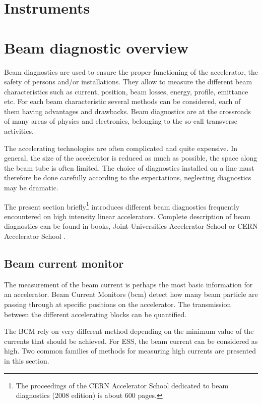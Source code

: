 \begin{refsection}
  \section{Instruments}

  

  \section{Beam diagnostic overview}
  Beam diagnostics are used to ensure the proper functioning of the accelerator, the safety of persons and/or installations. They allow to measure the different beam characteristics such as current, position, beam losses, energy, profile, emittance etc. For each beam characteristic several methods can be considered, each of them having advantages and drawbacks. Beam diagnostics are at the crossroads of many areas of physics and electronics, belonging to the so-call transverse activities.

  The accelerating technologies are often complicated and quite expensive. In general, the size of the accelerator is reduced as much as possible, the space along the beam tube is often limited. The choice of diagnostics installed on a line must therefore be done carefully according to the expectations, neglecting diagnostics may be dramatic.

  The present section briefly\footnote{The proceedings of the CERN Accelerator School dedicated to beam diagnostics (2008 edition) is about 600 pages.} introduces different beam diagnostics frequently encountered on high intensity linear accelerators. Complete description of beam diagnostics can be found in books\cite{strehl2006}, Joint Universities Accelerator School \cite{juas2019} or CERN Accelerator School \cite{cas2019}.

  \subsection{Beam current monitor}
  The measurement of the beam current is perhaps the most basic information for an accelerator. Beam Current Monitors (\acrshort{bcm}) detect how many beam particle are passing through at specific positions on the accelerator. The transmission between the different accelerating blocks can be quantified.

  The BCM rely on very different method depending on the minimum value of the currents that should be achieved. For ESS, the beam current can be considered as high. Two common families of methods for measuring high currents are presented in this section.


\end{refsection}
